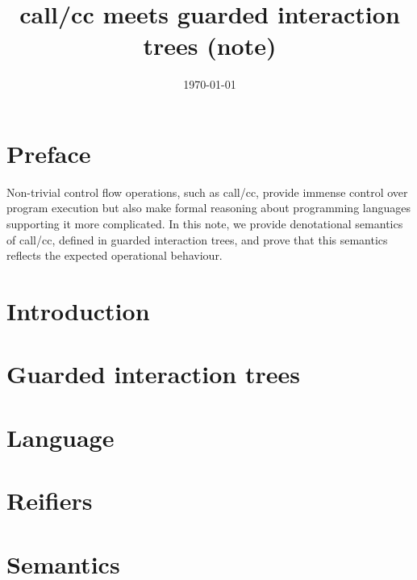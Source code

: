 \documentclass[a4paper]{article}
\title{call/cc meets guarded interaction trees (note)}
\author{}
\date{\today}
\theoremstyle{break}
\theoremstyle{remark}
\begin{document}
\maketitle

\noindent

\section*{Preface}
Non-trivial control flow operations, such as call/cc, provide immense
control over program execution but also make formal reasoning about
programming languages supporting it more complicated. In this note, we
provide denotational semantics of call/cc, defined in guarded
interaction trees, and prove that this semantics reflects the expected
operational behaviour.
\label{global:sec:preface}

\tableofcontents

\clearpage

\section{Introduction}
\label{global:sec:intro}


\section{Guarded interaction trees}
\label{global:sec:gitree}


\section{Language}
\label{global:sec:lang}


\section{Reifiers}
\label{global:sec:reifier}


\section{Semantics}
\label{global:sec:sem}


% 

% 

\nocite{*}

\end{document}
